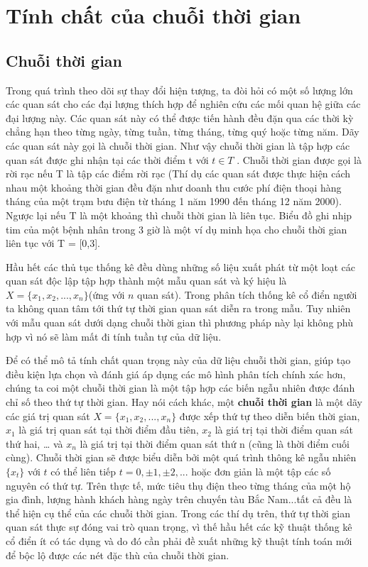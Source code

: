 \chapter{Tính chất của chuỗi thời gian}
\ifpdf
    \graphicspath{{01_timeseries/figures/PNG/}{01_timeseries/figures/PDF/}{01_timeseries/figures/}}
\else
    \graphicspath{{01_timeseries/figures/EPS/}{01_timeseries/figures/}}
\fi

\section{Chuỗi thời gian}
Trong quá trình theo dõi sự thay đổi hiện tượng, ta đòi hỏi có một số lượng lớn các quan sát cho các đại lượng thích hợp để nghiên cứu các mối quan hệ giữa các đại lượng này. Các quan sát này có thể được tiến hành đều đặn qua các thời kỳ chẳng hạn theo từng ngày, từng tuần, từng tháng, từng quý hoặc từng năm. Dãy các quan sát này gọi là chuỗi thời gian. Như vậy chuỗi thời gian là tập hợp các quan sát được ghi nhận tại các thời điểm t với $t \in T$ . Chuỗi thời gian được gọi là rời rạc nếu T là tập các điểm rời rạc (Thí dụ các quan sát được thực hiện cách nhau một khoảng thời gian đều đặn như doanh thu cước phí điện thoại hàng tháng của một trạm bưu điện từ tháng 1 năm 1990 đến tháng 12 năm 2000). Ngược lại nếu T là một khoảng thì chuỗi thời gian là liên tục. Biểu đồ ghi nhịp tim của một bệnh nhân trong 3 giờ là một ví dụ minh họa cho chuỗi thời gian liên tục với T =  [0,3].

Hầu hết các thủ tục thống kê đều dùng những số liệu xuất phát từ một loạt các quan sát độc lập tập hợp thành một mẫu quan sát và ký hiệu là $X =\{x_1,x_2,...,x_n\}$(ứng với $n$ quan sát). Trong phân tích thống kê cổ điển người ta không quan tâm tới thứ tự thời gian quan sát diễn ra trong mẫu. Tuy nhiên với mẫu quan sát dưới dạng chuỗi thời gian thì phương pháp này lại không phù hợp vì nó sẽ làm mất đi tính tuần tự của dữ liệu.

Để có thể mô tả tính chất quan trọng này của dữ liệu chuỗi thời gian, giúp tạo điều kiện lựa chọn và đánh giá áp dụng các mô hình phân tích chính xác hơn, chúng ta coi một chuỗi thời gian là một tập hợp các biến ngẫu nhiên được đánh chỉ số theo thứ tự thời gian. Hay nói cách khác, một \textbf{chuỗi thời gian}\citep{ross} là một dãy các giá trị quan sát $X =\{x_1,x_2,...,x_n\}$ được xếp thứ tự theo diễn biến thời gian, $x_1$ là giá trị quan sát tại thời điểm đầu tiên, $x_2$ là giá trị tại thời điểm quan sát thứ hai, … và $x_n$  là giá trị tại thời điểm quan sát thứ n (cũng là thời điểm cuối cùng). Chuỗi thời gian sẽ được biểu diễn bởi một quá trình thông kê ngẫu nhiên $\{x_t\}$ với $t$ có thể liên tiếp $t = 0, \pm1,\pm2,...$ hoặc đơn giản là một tập các số nguyên có thứ tự. Trên thực tế, mức tiêu thụ điện theo từng tháng của một hộ gia đình, lượng hành khách hàng ngày trên chuyến tàu Bắc Nam...tất cả đều là thể hiện cụ thể của các chuỗi thời gian. Trong các thí dụ trên, thứ tự thời gian quan sát thực sự đóng vai trò quan trọng, vì thế hầu hết các kỹ thuật thống kê cổ điển ít có tác dụng và do đó cần phải đề xuất những kỹ thuật tính toán mới để bộc lộ được các nét đặc thù của chuỗi thời gian. 

